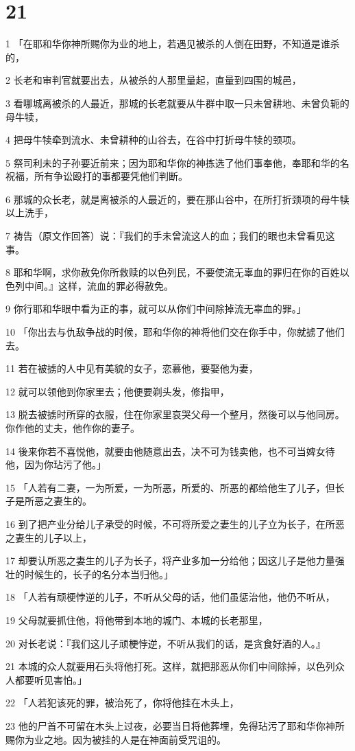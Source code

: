 \chapter{21}

\par 1 「在耶和华你神所赐你为业的地上，若遇见被杀的人倒在田野，不知道是谁杀的，
\par 2 长老和审判官就要出去，从被杀的人那里量起，直量到四围的城邑，
\par 3 看哪城离被杀的人最近，那城的长老就要从牛群中取一只未曾耕地、未曾负轭的母牛犊，
\par 4 把母牛犊牵到流水、未曾耕种的山谷去，在谷中打折母牛犊的颈项。
\par 5 祭司利未的子孙要近前来；因为耶和华你的神拣选了他们事奉他，奉耶和华的名祝福，所有争讼殴打的事都要凭他们判断。
\par 6 那城的众长老，就是离被杀的人最近的，要在那山谷中，在所打折颈项的母牛犊以上洗手，
\par 7 祷告（原文作回答）说：『我们的手未曾流这人的血；我们的眼也未曾看见这事。
\par 8 耶和华啊，求你赦免你所救赎的以色列民，不要使流无辜血的罪归在你的百姓以色列中间。』这样，流血的罪必得赦免。
\par 9 你行耶和华眼中看为正的事，就可以从你们中间除掉流无辜血的罪。」
\par 10 「你出去与仇敌争战的时候，耶和华你的神将他们交在你手中，你就掳了他们去。
\par 11 若在被掳的人中见有美貌的女子，恋慕他，要娶他为妻，
\par 12 就可以领他到你家里去；他便要剃头发，修指甲，
\par 13 脱去被掳时所穿的衣服，住在你家里哀哭父母一个整月，然後可以与他同房。你作他的丈夫，他作你的妻子。
\par 14 後来你若不喜悦他，就要由他随意出去，决不可为钱卖他，也不可当婢女待他，因为你玷污了他。」
\par 15 「人若有二妻，一为所爱，一为所恶，所爱的、所恶的都给他生了儿子，但长子是所恶之妻生的。
\par 16 到了把产业分给儿子承受的时候，不可将所爱之妻生的儿子立为长子，在所恶之妻生的儿子以上，
\par 17 却要认所恶之妻生的儿子为长子，将产业多加一分给他；因这儿子是他力量强壮的时候生的，长子的名分本当归他。」
\par 18 「人若有顽梗悖逆的儿子，不听从父母的话，他们虽惩治他，他仍不听从，
\par 19 父母就要抓住他，将他带到本地的城门、本城的长老那里，
\par 20 对长老说：『我们这儿子顽梗悖逆，不听从我们的话，是贪食好酒的人。』
\par 21 本城的众人就要用石头将他打死。这样，就把那恶从你们中间除掉，以色列众人都要听见害怕。」
\par 22 「人若犯该死的罪，被治死了，你将他挂在木头上，
\par 23 他的尸首不可留在木头上过夜，必要当日将他葬埋，免得玷污了耶和华你神所赐你为业之地。因为被挂的人是在神面前受咒诅的。

